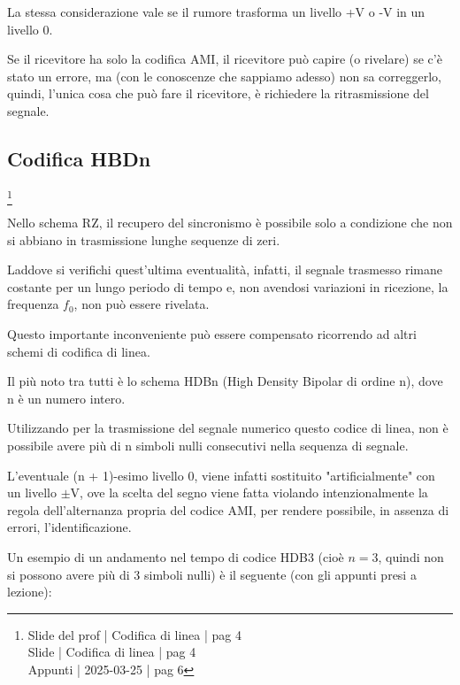 La stessa considerazione vale se il rumore trasforma un livello +V o -V in un livello 0. \newline 

Se il ricevitore ha solo la codifica AMI, il ricevitore può capire (o rivelare) se c'è stato un errore, 
ma (con le conoscenze che sappiamo adesso) non sa correggerlo, 
quindi, l'unica cosa che può fare il ricevitore, è richiedere la ritrasmissione del segnale. \newline 

\newpage 

\subsection{Codifica HBDn}
\footnote{Slide del prof | Codifica di linea | pag 4 \\
Slide | Codifica di linea | pag  4\\  
Appunti | 2025-03-25 | pag 6
}

Nello schema RZ, il recupero del sincronismo è possibile solo a condizione che non si abbiano in trasmissione lunghe sequenze di zeri. \newline 

Laddove si verifichi quest'ultima eventualità, infatti, il segnale trasmesso rimane costante per un lungo periodo di tempo e, non avendosi variazioni in ricezione, 
la frequenza $f_0$, non può essere rivelata. \newline 

Questo importante inconveniente può essere compensato ricorrendo ad altri schemi di codifica di linea. \newline 

Il più noto tra tutti è lo schema HDBn (High Density Bipolar di ordine n), 
dove n è un numero intero. \newline 

Utilizzando per la trasmissione del segnale numerico questo codice di linea, 
non è possibile avere più di n simboli nulli consecutivi nella sequenza di segnale. \newline 

L'eventuale (n + 1)-esimo livello 0, viene infatti sostituito "artificialmente" con un livello $\pm$V, 
ove la scelta del segno viene fatta violando intenzionalmente la regola dell'alternanza propria del codice AMI, 
per rendere possibile, in assenza di errori, l'identificazione. \newline 

Un esempio di un andamento nel tempo di codice HDB3 (cioè $n=3$, quindi non si possono avere più di 3 simboli nulli) 
è il seguente (con gli appunti presi a lezione): 

